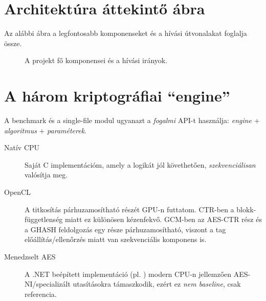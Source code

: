 \section{Architektúra áttekintő ábra}

Az alábbi ábra a legfontosabb komponenseket és a hívási útvonalakat foglalja össze.

\begin{figure}[H]
  \centering
  \caption{A projekt fő komponensei és a hívási irányok.}
\end{figure}

\section{A három kriptográfiai ``engine''}

A benchmark és a single-file modul ugyanazt a \emph{fogalmi} API-t használja: \emph{engine} + \emph{algoritmus} + \emph{paraméterek}.

\begin{description}
  \item[Natív CPU] Saját C implementációm, amely a logikát jól követhetően, \emph{szekvenciálisan} valósítja meg.
  \item[OpenCL] A titkosítás párhuzamosítható részét GPU-n futtatom. CTR-ben a blokk-függetlenség miatt ez különösen kézenfekvő.
        GCM-ben az AES-CTR rész és a GHASH feldolgozás egy része párhuzamosítható, viszont a tag előállítás/ellenőrzés miatt van szekvenciális komponens is.
  \item[Menedzselt AES] A .NET beépített implementáció (pl. ) modern CPU-n jellemzően AES-NI/specializált utasításokra támaszkodik,
        ezért ez \emph{nem baseline}, csak referencia.
\end{description}

